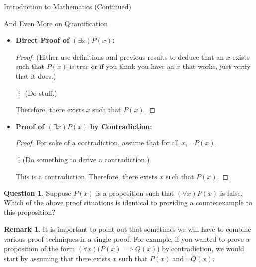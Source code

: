 \documentclass[11pt]{article}
\theoremstyle{definition}
\newtheorem{remark}[theorem]{Remark}
\newtheorem{question}[theorem]{Question}
\begin{document}
\begin{section}{Introduction to Mathematics (Continued)}
\begin{subsection}{And Even More on Quantification}
\begin{itemize}
\begin{proof}
\bigskip

\noindent This is a contradiction.  Therefore, for all $x$, $P(x)$ is true.
\end{proof}

\item[] \textbf{Direct Proof of $(\exists x)P(x)$:}

\begin{proof}
(Either use definitions and previous results to deduce that an $x$ exists such that $P(x)$ is true or if you think you have an $x$ that works, just verify that it does.)

\bigskip

\hspace{2in}\vdots \hspace{1cm} (Do stuff.)

\bigskip

Therefore, there exists $x$ such that $P(x)$.
\end{proof}

\item[] \textbf{Proof of $(\exists x)P(x)$ by Contradiction:}

\begin{proof}
For sake of a contradiction, assume that for all $x$, $\neg P(x)$.

\bigskip

\hspace{2in}\vdots \hspace{1cm}(Do something to derive a contradiction.)

\bigskip

This is a contradiction.  Therefore, there exists $x$ such that $P(x)$.
\end{proof}

\end{itemize}

\begin{question}
Suppose $P(x)$ is a proposition such that $(\forall x)P(x)$ is false.  Which of the above proof situations is identical to providing a counterexample to this proposition?
\end{question}

\begin{remark}
It is important to point out that sometimes we will have to combine various proof techniques in a single proof.  For example, if you wanted to prove a proposition of the form $(\forall x)(P(x) \implies Q(x)$) by contradiction, we would start by assuming that there exists $x$ such that $P(x)$ and $\neg Q(x)$.
\end{remark}


\end{subsection}
\end{section}
\end{document}
